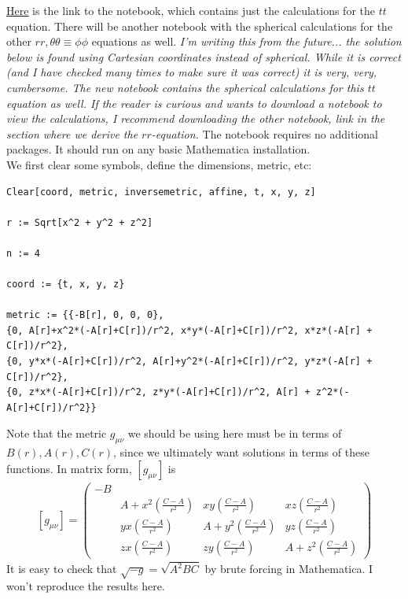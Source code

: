 \documentclass{book}
\theoremstyle{definition}
\newcommand{\f}[2]{\frac{#1}{#2}}
\newcommand{\lp}{\left(}
\newcommand{\rp}{\right)}
\begin{document}
\href{https://huanqbui.com/LaTeX projects/HuanBui_QM/Cartesian_Vainshtein.nb}{\underline{Here}} is the link to the notebook, which contains just the calculations for the $tt$ equation. There will be another notebook with the spherical calculations for the other $rr,\theta\theta\equiv \phi\phi$ equations as well. \textit{I'm writing this from the future... the solution below is found using Cartesian coordinates instead of spherical. While it is correct (and I have checked many times to make sure it was correct) it is very, very, cumbersome. The new notebook contains the spherical calculations for this $tt$ equation as well. If the reader is curious and wants to download a notebook to view the calculations, I recommend downloading the other notebook, link in the section where we derive the $rr$-equation.} The notebook requires no additional packages. It should run on any basic Mathematica installation. \\
 
We first clear some symbols, define the dimensions, metric, etc:
\begin{lstlisting}
Clear[coord, metric, inversemetric, affine, t, x, y, z]

r := Sqrt[x^2 + y^2 + z^2]

n := 4

coord := {t, x, y, z}

metric := {{-B[r], 0, 0, 0},
{0, A[r]+x^2*(-A[r]+C[r])/r^2, x*y*(-A[r]+C[r])/r^2, x*z*(-A[r] + C[r])/r^2},
{0, y*x*(-A[r]+C[r])/r^2, A[r]+y^2*(-A[r]+C[r])/r^2, y*z*(-A[r] + C[r])/r^2},
{0, z*x*(-A[r]+C[r])/r^2, z*y*(-A[r]+C[r])/r^2, A[r] + z^2*(-A[r]+C[r])/r^2}}
\end{lstlisting}
Note that the metric $g_{\mu\nu}$ we should be using here must be in terms of $B(r), A(r), C(r)$, since we ultimately want solutions in terms of these functions. In matrix form, $[g_{\mu\nu}]$ is
\begin{align}
\boxed{[g_{\mu\nu}] = \begin{pmatrix}
	-B &&&\\
	&A + x^2\lp \f{C-A}{r^2} \rp&xy\lp \f{C-A}{r^2} \rp&xz\lp \f{C-A}{r^2} \rp\\
	&yx\lp \f{C-A}{r^2} \rp&A+ y^2\lp \f{C-A}{r^2} \rp&yz\lp \f{C-A}{r^2} \rp\\
	&zx\lp \f{C-A}{r^2} \rp&zy\lp \f{C-A}{r^2} \rp&A+ z^2\lp \f{C-A}{r^2} \rp
	\end{pmatrix}}
\end{align}
It is easy to check that $\sqrt{-g} = \sqrt{A^2BC}$ by brute forcing in Mathematica. I won't reproduce the results here. \\
\end{document}
